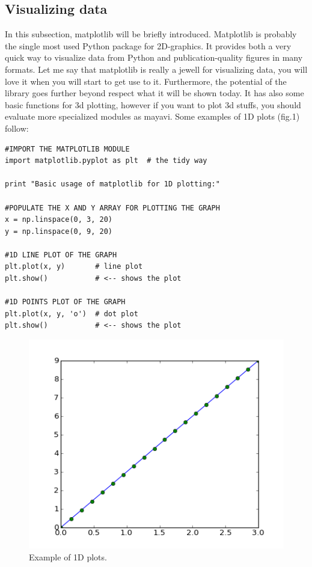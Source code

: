 \documentclass[aps,letterpaper,10pt]{revtex4}
\begin{document}
\subsection{Visualizing data}
In this subsection, matplotlib will be briefly introduced. Matplotlib is probably the single most used Python package for 2D-graphics. It provides both a very quick way to visualize data from Python and publication-quality figures in many formats. Let me say that matplotlib is really a jewell for visualizing data, you will love it when you will start to get use to it. Furthermore, the potential of the library goes further beyond respect what it will be shown today. It has also some basic functions for 3d plotting, however if you want to plot 3d stuffs, you should evaluate more specialized modules as mayavi. Some examples of 1D plots (fig.1) follow:
\begin{lstlisting}
#IMPORT THE MATPLOTLIB MODULE
import matplotlib.pyplot as plt  # the tidy way

print "Basic usage of matplotlib for 1D plotting:"

#POPULATE THE X AND Y ARRAY FOR PLOTTING THE GRAPH
x = np.linspace(0, 3, 20)
y = np.linspace(0, 9, 20)

#1D LINE PLOT OF THE GRAPH
plt.plot(x, y)       # line plot 
plt.show()           # <-- shows the plot

#1D POINTS PLOT OF THE GRAPH
plt.plot(x, y, 'o')  # dot plot
plt.show()           # <-- shows the plot
\end{lstlisting}
\begin{figure}[h]
\includegraphics[scale=0.3]{img/numpy_plot1D.png}
\caption{Example of 1D plots.}\label{fig:1}
\end{figure}
\end{document}
